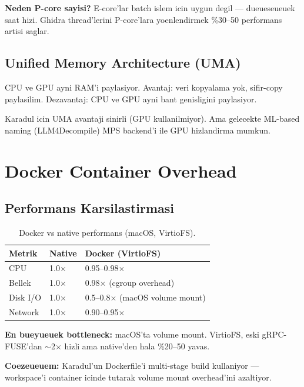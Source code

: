 \textbf{Neden P-core sayisi?} E-core'lar batch islem icin uygun degil --- dueueseueuek saat hizi. Ghidra thread'lerini P-core'lara yoenlendirmek \%30--50 performans artisi saglar.

\subsection{Unified Memory Architecture (UMA)}

CPU ve GPU ayni RAM'i paylasiyor. Avantaj: veri kopyalama yok, sifir-copy paylasilim. Dezavantaj: CPU ve GPU ayni bant genisligini paylasiyor.

Karadul icin UMA avantaji sinirli (GPU kullanilmiyor). Ama gelecekte ML-based naming (LLM4Decompile) MPS backend'i ile GPU hizlandirma mumkun.


\section{Docker Container Overhead}
\label{sec:docker-deep}

\subsection{Performans Karsilastirmasi}

\begin{table}[ht]
\centering
\begin{tabular}{lll}
\toprule
\textbf{\color{sectioncyan}Metrik} & \textbf{\color{sectioncyan}Native} & \textbf{\color{sectioncyan}Docker (VirtioFS)} \\
\midrule
CPU & 1.0$\times$ & 0.95--0.98$\times$ \\
Bellek & 1.0$\times$ & 0.98$\times$ (cgroup overhead) \\
Disk I/O & 1.0$\times$ & 0.5--0.8$\times$ (macOS volume mount) \\
Network & 1.0$\times$ & 0.90--0.95$\times$ \\
\bottomrule
\end{tabular}
\caption{Docker vs native performans (macOS, VirtioFS).}
\end{table}

\textbf{En bueyueuek bottleneck:} macOS'ta volume mount. VirtioFS, eski gRPC-FUSE'dan $\sim$2$\times$ hizli ama native'den hala \%20--50 yavas.

\textbf{Coezeueuem:} Karadul'un Dockerfile'i multi-stage build kullaniyor --- workspace'i container icinde tutarak volume mount overhead'ini azaltiyor.
